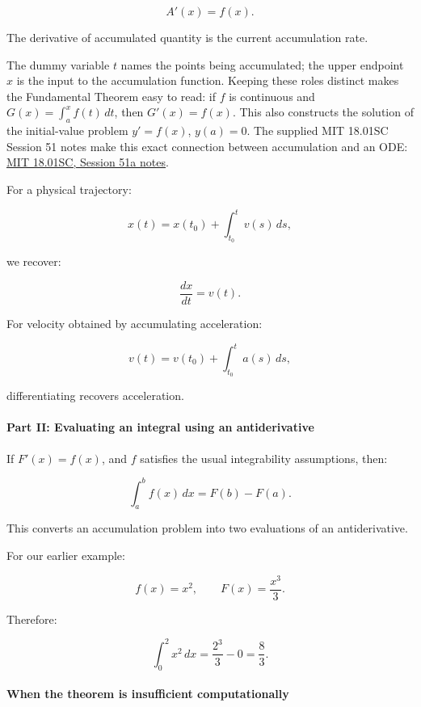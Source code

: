 \[
A'(x)=f(x).
\]

The derivative of accumulated quantity is the current accumulation rate.

The dummy variable \(t\) names the points being accumulated; the upper endpoint \(x\) is the input to the accumulation function. Keeping these roles distinct makes the Fundamental Theorem easy to read: if \(f\) is continuous and \(G(x)=\int_a^x f(t)\,dt\), then \(G'(x)=f(x)\). This also constructs the solution of the initial-value problem \(y'=f(x)\), \(y(a)=0\). The supplied MIT 18.01SC Session 51 notes make this exact connection between accumulation and an ODE: \href{https://ocw.mit.edu/courses/18-01sc-single-variable-calculus-fall-2010/2459faee7ec3308afd5cca2b95fad48e_MIT18_01SCF10_Ses51a.pdf}{MIT 18.01SC, Session 51a notes}.

For a physical trajectory:

\[
x(t)=x(t_0)+\int_{t_0}^{t}v(s)\,ds,
\]

we recover:

\[
\frac{dx}{dt}=v(t).
\]

For velocity obtained by accumulating acceleration:

\[
v(t)=v(t_0)+\int_{t_0}^{t}a(s)\,ds,
\]

differentiating recovers acceleration.

\paragraph{Part II: Evaluating an integral using an antiderivative}\label{02-foundations-ii-ch022-part-ii-evaluating-an-integral-using-an-antiderivative}

\hypertarget{02-foundations-ii-ch022-part-ii-evaluating-an-integral-using-an-antiderivative}{}

If \(F'(x)=f(x)\), and \(f\) satisfies the usual integrability assumptions, then:

\[
\boxed{\int_a^b f(x)\,dx=F(b)-F(a)}.
\]

This converts an accumulation problem into two evaluations of an antiderivative.

For our earlier example:

\[
f(x)=x^2,\qquad F(x)=\frac{x^3}{3}.
\]

Therefore:

\[
\int_0^2x^2\,dx = \frac{2^3}{3}-0 =\frac83.
\]

\paragraph{When the theorem is insufficient computationally}\label{02-foundations-ii-ch022-when-the-theorem-is-insufficient-computationally}


